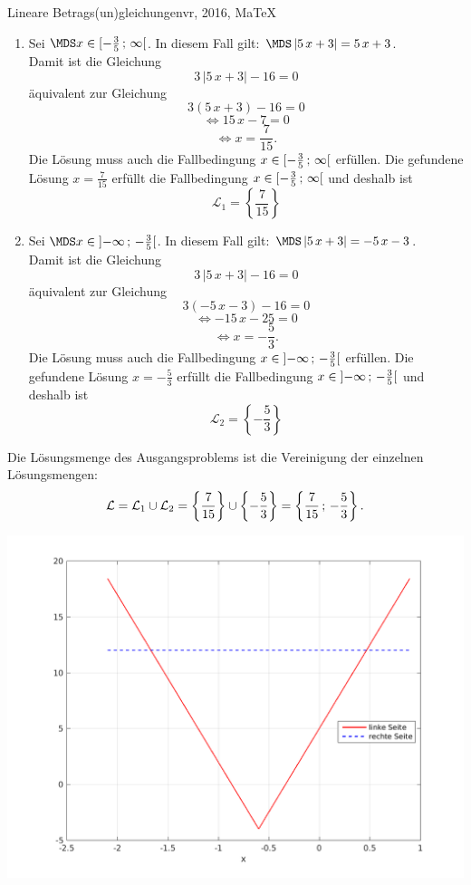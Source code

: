 \begin{MAufgabe}{Lineare Betrags(un)gleichungen}{vr, 2016, MaTeX}
 \begin{enumerate} 
 \item Sei $ \MDS x\in[ - \frac{3}{5} \, \MIntvlSep \, \infty\MoIr $. 
 In diesem Fall gilt:  
  $ \MDS \left| 5\, x + 3\right|=5\, x + 3$. \\ 
 Damit ist die Gleichung 
 $$ 
3\, \left|5\, x + 3\right| - 16= 0
$$
 \"aquivalent zur Gleichung
 $$ 
3\left(5\, x + 3\right)-16= 0 
$$  
$$ 
 \Leftrightarrow 15\, x - 7= 0 
$$  
$$ \Leftrightarrow x = \frac{7}{15} . 
 $$ 
 Die L\"osung muss auch die Fallbedingung $x\in [ - \frac{3}{5} \, ; \, \infty[\mbox{}  $ erf\"ullen. Die gefundene L\"osung $x=\frac{7}{15}$ erf\"ullt die Fallbedingung  $x\in [ - \frac{3}{5} \, ; \, \infty[\mbox{} $ und deshalb ist  $$
 \mathcal{L}_{1}=\left\{\frac{7}{15}\right\}
 $$ 
\item Sei $ \MDS x\in\MoIl  -\infty \, \MIntvlSep \, - \frac{3}{5}\MoIr $. 
 In diesem Fall gilt:  
  $ \MDS \left| 5\, x + 3\right|= - 5\, x - 3$. \\ 
 Damit ist die Gleichung 
 $$ 
3\, \left|5\, x + 3\right| - 16= 0
$$
 \"aquivalent zur Gleichung
 $$ 
3\left( - 5\, x - 3\right)-16= 0 
$$  
$$ 
 \Leftrightarrow  - 15\, x - 25= 0 
$$  
$$ \Leftrightarrow x = - \frac{5}{3} . 
 $$ 
 Die L\"osung muss auch die Fallbedingung $x\in \mbox{}]\mathopen{}  -\infty \, ; \, - \frac{3}{5}[\mbox{}  $ erf\"ullen. Die gefundene L\"osung $x=- \frac{5}{3}$ erf\"ullt die Fallbedingung  $x\in \mbox{}]\mathopen{}  -\infty \, ; \, - \frac{3}{5}[\mbox{} $ und deshalb ist  $$
 \mathcal{L}_{2}=\left\{- \frac{5}{3}\right\}
 $$ 
 \end{enumerate} 
  Die L\"osungsmenge des Ausgangsproblems ist die Vereinigung der einzelnen L\"osungsmengen: 
$$ \mathcal{L} = \mathcal{L}_{1} \cup \mathcal{L}_{2} 
 = \left\{\frac{7}{15}\right\}\cup \left\{- \frac{5}{3}\right\} 
  = \left\{\frac{7}{15}\, ; \,- \frac{5}{3}\right\} 
 . $$ 
 
 \begin{center}
 \includegraphics[width=0.8\linewidth]{Abb_zur_Ag_autogenerated_ineq_12.png} \end{center}
 
\else\relax\fi
 \end{MAufgabe}